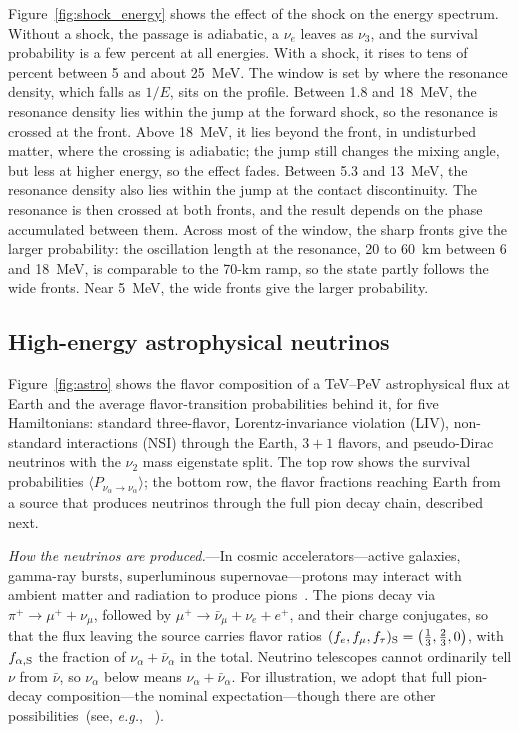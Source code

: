 \documentclass[final,5p,times,twocolumn,sort,compress]{elsarticle}
\makeatletter
\newcommand{\eg}{{\it e.g.}}
\DeclareRobustCommand{\_}{%
  \ifmmode\nfss@text{\textunderscore}\else\textunderscore\allowbreak\fi}
\providecommand{\Ref}{}
\makeatother
\begin{document}
Figure~\ref{fig:shock_energy} shows the effect of the shock on the energy spectrum. Without a shock, the passage is adiabatic, a $\nu_e$ leaves as $\nu_3$, and the survival probability is a few percent at all energies. With a shock, it rises to tens of percent between 5 and about 25~MeV. The window is set by where the resonance density, which falls as $1/E$, sits on the profile. Between 1.8 and 18~MeV, the resonance density lies within the jump at the forward shock, so the resonance is crossed at the front. Above 18~MeV, it lies beyond the front, in undisturbed matter, where the crossing is adiabatic; the jump still changes the mixing angle, but less at higher energy, so the effect fades. Between 5.3 and 13~MeV, the resonance density also lies within the jump at the contact discontinuity. The resonance is then crossed at both fronts, and the result depends on the phase accumulated between them. Across most of the window, the sharp fronts give the larger probability: the oscillation length at the resonance, 20 to 60~km between 6 and 18~MeV, is comparable to the 70-km ramp, so the state partly follows the wide fronts. Near 5~MeV, the wide fronts give the larger probability.


\subsection{High-energy astrophysical neutrinos}
\label{sec:astro}

Figure~\ref{fig:astro} shows the flavor composition of a TeV--PeV astrophysical flux at Earth and the average flavor-transition probabilities behind it, for five Hamiltonians: standard three-flavor, Lorentz-invariance violation (LIV), non-standard interactions (NSI) through the Earth, $3+1$ flavors, and pseudo-Dirac neutrinos with the $\nu_2$ mass eigenstate split. The top row shows the survival probabilities $\langle P_{\nu_\alpha \to \nu_\alpha}\rangle$; the bottom row, the flavor fractions reaching Earth from a source that produces neutrinos through the full pion decay chain, described next.

\smallskip

\textit{How the neutrinos are produced.}---In cosmic accelerators---active galaxies, gamma-ray bursts, superluminous supernovae---protons may interact with ambient matter and radiation to produce pions\ \cite{Margolis:1977wt, Stecker:1978ah, Kelner:2006tc}. The pions decay via $\pi^+ \to \mu^+ + \nu_\mu$, followed by $\mu^+ \to \bar{\nu}_\mu + \nu_e + e^+$, and their charge conjugates, so that the flux leaving the source carries flavor ratios $(f_e, f_\mu, f_\tau)_{\rm S} = \left(\frac{1}{3}, \frac{2}{3}, 0\right)$, with $f_{\alpha, {\rm S}}$ the fraction of $\nu_\alpha + \bar{\nu}_\alpha$ in the total. Neutrino telescopes cannot ordinarily tell $\nu$ from $\bar\nu$, so $\nu_\alpha$ below means $\nu_\alpha + \bar{\nu}_\alpha$. For illustration, we adopt that full pion-decay composition---the nominal expectation---though there are other possibilities~(see, \eg, \Ref~\cite{Bustamante:2015waa}).
\end{document}
